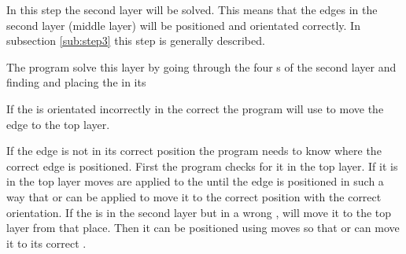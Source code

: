 In this step the second layer will be solved. 
This means that the edges in the second layer (middle layer) will be positioned and orientated correctly. 
In subsection \ref{sub:step3} this step is generally described. 

The program solve this layer by going through the four \cubicle{}s of the second layer and finding and placing the \cpiece{} in its \cubicle{}

If the \cpiece{} is orientated incorrectly in the correct \cubicle{} the program will use   to move the edge \cpiece{} to the top layer.

If the edge \cpiece{} is not in its correct position the program needs to know where the correct edge \cpiece{} is positioned. First the program checks for it in the top layer. 
If it is in the top layer  moves are applied to the \rubik{} until the edge \cpiece{} is positioned in such a way that  or  can be applied to move it to the correct position with the correct orientation. 
If the \cpiece{} is in the second layer but in a wrong \cubicle{},  will move it to the top layer from that place. 
Then it can be positioned using  moves so that  or  can move it to its correct \cubicle{}.